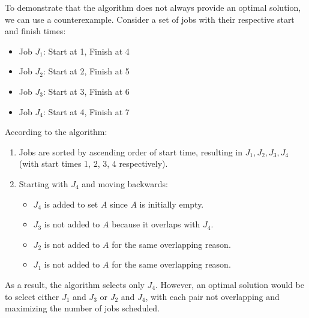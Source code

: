 \documentclass{article}
\begin{document}
To demonstrate that the algorithm does not always provide an optimal solution, we can use a counterexample. Consider a set of jobs with their respective start and finish times:

\begin{itemize}
    \item Job \(J_1\): Start at 1, Finish at 4
    \item Job \(J_2\): Start at 2, Finish at 5
    \item Job \(J_3\): Start at 3, Finish at 6
    \item Job \(J_4\): Start at 4, Finish at 7
\end{itemize}

According to the algorithm:

\begin{enumerate}
    \item Jobs are sorted by ascending order of start time, resulting in \(J_1, J_2, J_3, J_4\) (with start times 1, 2, 3, 4 respectively).
    \item Starting with \(J_4\) and moving backwards:
    \begin{itemize}
        \item \(J_4\) is added to set \(A\) since \(A\) is initially empty.
        \item \(J_3\) is not added to \(A\) because it overlaps with \(J_4\).
        \item \(J_2\) is not added to \(A\) for the same overlapping reason.
        \item \(J_1\) is not added to \(A\) for the same overlapping reason.
    \end{itemize}
\end{enumerate}

As a result, the algorithm selects only \(J_4\). However, an optimal solution would be to select either \(J_1\) and \(J_3\) or \(J_2\) and \(J_4\), with each pair not overlapping and maximizing the number of jobs scheduled. 
\end{document}
